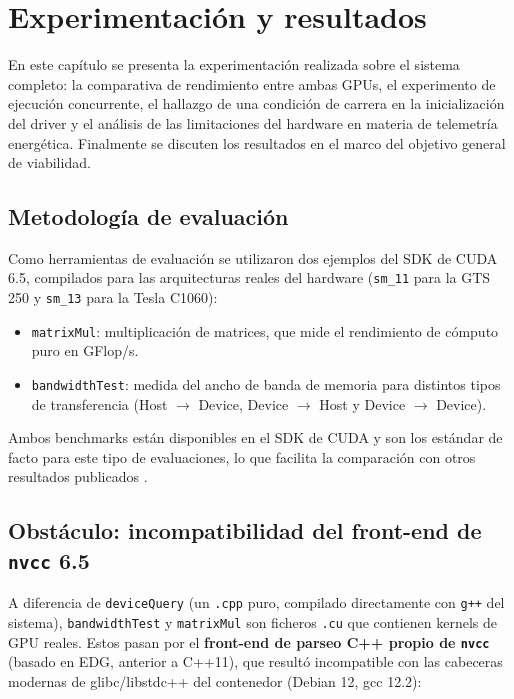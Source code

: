 \chapter{Experimentación y resultados} \label{cap5}

En este capítulo se presenta la experimentación realizada sobre el sistema completo: la comparativa de rendimiento entre ambas GPUs, el experimento de ejecución concurrente, el hallazgo de una condición de carrera en la inicialización del driver y el análisis de las limitaciones del hardware en materia de telemetría energética. Finalmente se discuten los resultados en el marco del objetivo general de viabilidad.

\section{Metodología de evaluación}

Como herramientas de evaluación se utilizaron dos ejemplos del SDK de CUDA 6.5, compilados para las arquitecturas reales del hardware (\texttt{sm\_11} para la GTS 250 y \texttt{sm\_13} para la Tesla C1060):

\begin{itemize}
    \item \texttt{matrixMul}: multiplicación de matrices, que mide el rendimiento de cómputo puro en GFlop/s.
    \item \texttt{bandwidthTest}: medida del ancho de banda de memoria para distintos tipos de transferencia (Host $\rightarrow$ Device, Device $\rightarrow$ Host y Device $\rightarrow$ Device).
\end{itemize}

Ambos benchmarks están disponibles en el SDK de CUDA y son los estándar de facto para este tipo de evaluaciones, lo que facilita la comparación con otros resultados publicados \cite{cuda65_perf_report}.

\section{Obstáculo: incompatibilidad del front-end de \texttt{nvcc} 6.5}

A diferencia de \texttt{deviceQuery} (un \texttt{.cpp} puro, compilado directamente con \texttt{g++} del sistema), \texttt{bandwidthTest} y \texttt{matrixMul} son ficheros \texttt{.cu} que contienen kernels de GPU reales. Estos pasan por el \textbf{front-end de parseo C++ propio de \texttt{nvcc}} (basado en EDG, anterior a C++11), que resultó incompatible con las cabeceras modernas de glibc/libstdc++ del contenedor (Debian 12, gcc 12.2):

